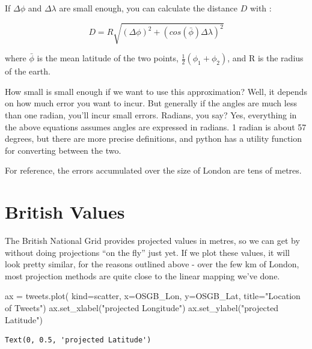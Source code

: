 \documentclass[
  letterpaper,
  DIV=11,
  numbers=noendperiod]{scrreprt}
\newenvironment{Shaded}{\begin{snugshade}}{\end{snugshade}}
\newcommand{\NormalTok}[1]{\textcolor[rgb]{0.00,0.23,0.31}{#1}}
\newcommand{\OperatorTok}[1]{\textcolor[rgb]{0.37,0.37,0.37}{#1}}
\newcommand{\StringTok}[1]{\textcolor[rgb]{0.13,0.47,0.30}{#1}}
\begin{document}
If \(\Delta\phi\) and \(\Delta\lambda\) are small enough, you can
calculate the distance \(D\) with :

\[D = R \sqrt{(\Delta\phi)^2+(cos(\bar{\phi})\Delta\lambda)^2}\]

where \(\bar{\phi}\) is the mean latitude of the two points,
\(\frac{1}{2}(\phi_1+\phi_2)\), and R is the radius of the earth.

How small is small enough if we want to use this approximation? Well, it
depends on how much error you want to incur. But generally if the angles
are much less than one radian, you'll incur small errors. Radians, you
say? Yes, everything in the above equations assumes angles are expressed
in radians. 1 radian is about 57 degrees, but there are more precise
definitions, and python has a utility function for converting between
the two.

For reference, the errors accumulated over the size of London are tens
of metres.

\hypertarget{british-values}{%
\section{British Values}\label{british-values}}

The British National Grid provides projected values in metres, so we can
get by without doing projections ``on the fly'' just yet. If we plot
these values, it will look pretty similar, for the reasons outlined
above - over the few km of London, most projection methods are quite
close to the linear mapping we've done.

\begin{Shaded}
\begin{Highlighting}[]
\NormalTok{ax }\OperatorTok{=}\NormalTok{ tweets.plot(}
\NormalTok{    kind}\OperatorTok{=}\StringTok{\textquotesingle{}scatter\textquotesingle{}}\NormalTok{,}
\NormalTok{    x}\OperatorTok{=}\StringTok{\textquotesingle{}OSGB\_Lon\textquotesingle{}}\NormalTok{,}
\NormalTok{    y}\OperatorTok{=}\StringTok{\textquotesingle{}OSGB\_Lat\textquotesingle{}}\NormalTok{,}
\NormalTok{    title}\OperatorTok{=}\StringTok{"Location of Tweets"}\NormalTok{)}
\NormalTok{ax.set\_xlabel(}\StringTok{"projected Longitude"}\NormalTok{)}
\NormalTok{ax.set\_ylabel(}\StringTok{"projected Latitude"}\NormalTok{)}
\end{Highlighting}
\end{Shaded}

\begin{verbatim}
Text(0, 0.5, 'projected Latitude')
\end{verbatim}
\end{document}
